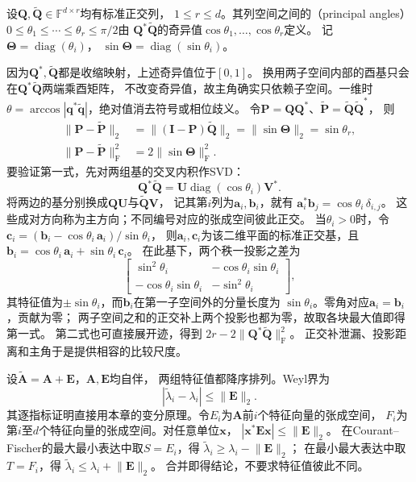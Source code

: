 \begin{definition}[等维子空间的主角]
\label{def:matrix-analysis-principal-angles}
设$\bm Q,\widetilde{\bm Q}\in\mathbb F^{d\times r}$均有标准正交列，
$1\leq r\leq d$。其列空间之间的（principal angles）
$0\leq\theta_1\leq\cdots\leq\theta_r\leq\pi/2$由
$\bm Q^*\widetilde{\bm Q}$的奇异值$\cos\theta_1,\ldots,\cos\theta_r$定义。
记$\bm\Theta=\operatorname{diag}(\theta_i)$，
$\sin\bm\Theta=\operatorname{diag}(\sin\theta_i)$。
\end{definition}
因为$\bm Q^*,\widetilde{\bm Q}$都是收缩映射，上述奇异值位于$[0,1]$。
换用两子空间内部的酉基只会在$\bm Q^*\widetilde{\bm Q}$两端乘酉矩阵，
不改变奇异值，故主角确实只依赖子空间。一维时
$\theta=\arccos|\bm q^*\widetilde{\bm q}|$，绝对值消去符号或相位歧义。
令$\bm P=\bm Q\bm Q^*$、$\widetilde{\bm P}=\widetilde{\bm Q}\widetilde{\bm Q}^*$，
则
\begin{align*}
 \lVert\bm P-\widetilde{\bm P}\rVert_2
 &=\lVert(\bm I-\bm P)\widetilde{\bm Q}\rVert_2
  =\lVert\sin\bm\Theta\rVert_2=\sin\theta_r,\\
 \lVert\bm P-\widetilde{\bm P}\rVert_{\mathrm F}^2
 &=2\lVert\sin\bm\Theta\rVert_{\mathrm F}^2.
\end{align*}
要验证第一式，先对两组基的交叉内积作SVD：
\[
 \bm Q^*\widetilde{\bm Q}
 =\bm U\operatorname{diag}(\cos\theta_i)\bm V^*.
\]
将两边的基分别换成$\bm Q\bm U$与$\widetilde{\bm Q}\bm V$，
记其第$i$列为$\bm a_i,\bm b_i$，就有
$\bm a_i^*\bm b_j=\cos\theta_i\,\delta_{i,j}$。
这些成对方向称为主方向；不同编号对应的张成空间彼此正交。
当$\theta_i>0$时，令
$\bm c_i=(\bm b_i-\cos\theta_i\,\bm a_i)/\sin\theta_i$，
则$\bm a_i,\bm c_i$为该二维平面的标准正交基，且
$\bm b_i=\cos\theta_i\,\bm a_i+\sin\theta_i\,\bm c_i$。
在此基下，两个秩一投影之差为
\[
 \begin{bmatrix}
  \sin^2\theta_i&-\cos\theta_i\sin\theta_i\\
  -\cos\theta_i\sin\theta_i&-\sin^2\theta_i
 \end{bmatrix},
\]
其特征值为$\pm\sin\theta_i$，而$\bm b_i$在第一子空间外的分量长度为
$\sin\theta_i$。零角对应$\bm a_i=\bm b_i$，贡献为零；
两子空间之和的正交补上两个投影也都为零，故取各块最大值即得第一式。
第二式也可直接展开迹，得到
$2r-2\lVert\bm Q^*\widetilde{\bm Q}\rVert_{\mathrm F}^2$。
正交补泄漏、投影距离和主角于是提供相容的比较尺度。


设$\widetilde{\bm A}=\bm A+\bm E$，$\bm A,\bm E$均自伴，
两组特征值都降序排列。Weyl界为
\begin{equation}
 |\widetilde\lambda_i-\lambda_i|\leq\lVert\bm E\rVert_2.
 \label{eq:matrix-analysis-weyl-eigenvalue-perturbation}
\end{equation}
其逐指标证明直接用本章的变分原理。令$E_i$为$\bm A$前$i$个特征向量的张成空间，
$F_i$为第$i$至$d$个特征向量的张成空间。对任意单位$\bm x$，
$|\bm x^*\bm E\bm x|\leq\lVert\bm E\rVert_2$。
在Courant--Fischer的最大最小表达中取$S=E_i$，得
$\widetilde\lambda_i\geq\lambda_i-\lVert\bm E\rVert_2$；
在最小最大表达中取$T=F_i$，得
$\widetilde\lambda_i\leq\lambda_i+\lVert\bm E\rVert_2$。
合并即得结论，不要求特征值彼此不同。

